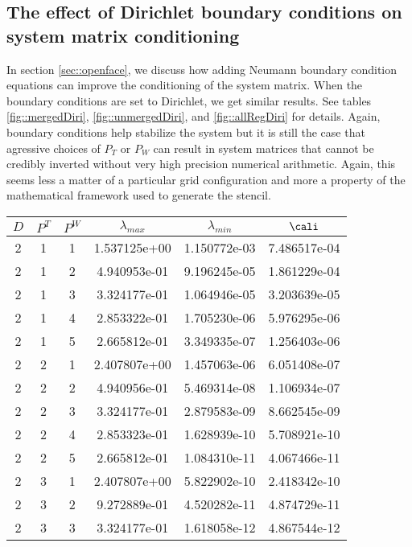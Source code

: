 \documentclass{article}
\begin{document}
{\subsection{The effect of Dirichlet boundary conditions on
  system matrix conditioning} In section \ref{sec::openface}, we
discuss how adding Neumann boundary condition equations can improve
the conditioning of the system matrix.  When the boundary conditions
are set to Dirichlet, we get similar results.  See tables
\ref{fig::mergedDiri}, \ref{fig::unmergedDiri}, and
\ref{fig::allRegDiri} for details.  Again, boundary conditions help
stabilize the system but it is still the case that agressive choices
of $P_T$ or $P_W$ can result in system matrices that cannot be
credibly inverted without very high precision numerical arithmetic.
Again, this seems less a matter of a particular grid configuration and
more  a property of the mathematical framework used to generate the stencil.
\begin{small}
\begin{table}
\begin{center}
\begin{tabular}{|ccc|ccc|} \hline
 $D$ & $P^T$  & $P^W$  & $\lambda_{max}$ & $\lambda_{min}$   & $\cali$ \\
 \hline
2 & 1 & 1 &  1.537125e+00 & 1.150772e-03 & 7.486517e-04 \\ 
2 & 1 & 2 &  4.940953e-01 & 9.196245e-05 & 1.861229e-04 \\ 
2 & 1 & 3 &  3.324177e-01 & 1.064946e-05 & 3.203639e-05 \\ 
2 & 1 & 4 &  2.853322e-01 & 1.705230e-06 & 5.976295e-06 \\ 
2 & 1 & 5 &  2.665812e-01 & 3.349335e-07 & 1.256403e-06 \\ 
2 & 2 & 1 &  2.407807e+00 & 1.457063e-06 & 6.051408e-07 \\ 
2 & 2 & 2 &  4.940956e-01 & 5.469314e-08 & 1.106934e-07 \\ 
2 & 2 & 3 &  3.324177e-01 & 2.879583e-09 & 8.662545e-09 \\ 
2 & 2 & 4 &  2.853323e-01 & 1.628939e-10 & 5.708921e-10 \\ 
2 & 2 & 5 &  2.665812e-01 & 1.084310e-11 & 4.067466e-11 \\ 
2 & 3 & 1 &  2.407807e+00 & 5.822902e-10 & 2.418342e-10 \\ 
2 & 3 & 2 &  9.272889e-01 & 4.520282e-11 & 4.874729e-11 \\ 
2 & 3 & 3 &  3.324177e-01 & 1.618058e-12 & 4.867544e-12 \\ 

\end{tabular}
\end{center}
\end{table}
\end{small}}
\end{document}
